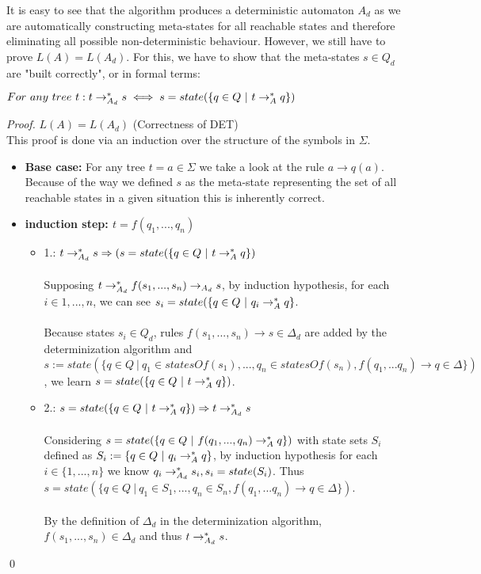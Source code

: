 \documentclass{llncs}
\begin{document}
\pagebreak

It is easy to see that the algorithm produces a deterministic automaton \(A_d\) as we are automatically constructing meta-states for all reachable states and therefore eliminating all possible non-deterministic behaviour. However, we still have to prove \(L(A) = L(A_d)\). For this, we have to show that the meta-states \(s \in Q_d\) are "built correctly", or in formal terms:

\begin{center}
	\(For~any~tree~t: t \rightarrow_{A_d}^* s \iff s = state(\{q \in Q ~|~ t \rightarrow_A^* q\})\)
\end{center}


\begin{proof}{\(L(A) = L(A_d)\) (Correctness of DET) \cite{tata-nfta}}\\
	This proof is done via an induction over the structure of the symbols in \(\Sigma\).
	\begin{itemize}
		\item \textbf{Base case:}
			For any tree \(t = a \in \Sigma\) we take a look at the rule \(a \rightarrow q(a)\). Because of the way we defined \(s\) as the meta-state representing the set of all reachable states in a given situation this is inherently correct.
			\\
		\item \textbf{induction step: \(t = f(q_1,... , q_n)\)}
			\begin{itemize}
				\item 
				1.: \(t \rightarrow_{A_d}^* s \Rightarrow (s = state(\{q \in Q ~|~ t \rightarrow_A^* q\})\)\\\\
				Supposing \(t \rightarrow_{A_d}^* f(s_1, ..., s_n) \rightarrow_{A_d} s\), by induction hypothesis, for each \(i \in {1,..., n}\), we can see \(s_i = state(\{q \in Q ~|~ q_i \rightarrow_A^* q\}\).\\
				\\
			    Because states \(s_i \in Q_d\), rules \(f(s_1, ..., s_n) \rightarrow s \in \Delta_d\) are added by the determinization algorithm and \( s := state(\{ q \in Q ~|~ q_1 \in statesOf(s_1),..., q_n \in statesOf(s_n), f(q_1,...q_n) \rightarrow q \in \Delta \}) \), we learn \(s = state(\{q \in Q ~|~ t \rightarrow_A^* q\})\).
				\\
				\item
				2.: \(s = state(\{q \in Q ~|~ t \rightarrow_A^* q\}) \Rightarrow t \rightarrow_{A_d}^* s\)\\\\
				Considering \(s = state(\{q \in Q ~|~ f(q_1, ..., q_n) \rightarrow_A^* q\})\) with state sets \(S_i\) defined as \(S_i := \{q \in Q ~|~ q_i \rightarrow_A^* q\}\), by induction hypothesis for each \(i \in \{1, ..., n\}\) we know \(q_i \rightarrow_{A_d}^* s_i, s_i = state(S_i)\).
				Thus \( s = state(\{ q \in Q ~|~ q_1 \in S_1,..., q_n \in S_n, f(q_1,...q_n) \rightarrow q \in \Delta \}) \).\\
				\\
				By the definition of \(\Delta_d\) in the determinization algorithm, \(f(s_1, ..., s_n) \in \Delta_d\) and thus \(t \rightarrow_{A_d}^* s\).
			\end{itemize}
	\end{itemize}
	\qed
\end{proof}
\end{document}
